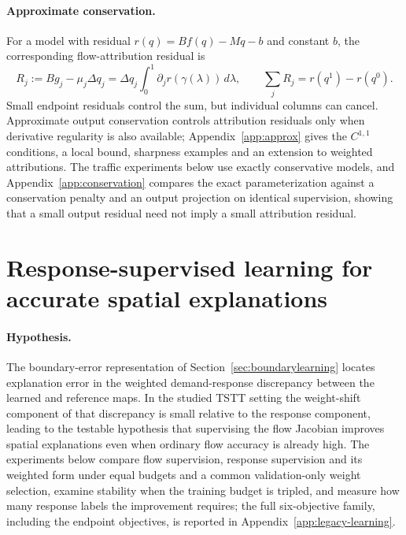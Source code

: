 \documentclass[a4paper,fleqn]{cas-sc}
\begin{document}
\paragraph{Approximate conservation.}
For a model with residual $r(q)=Bf(q)-Mq-b$ and constant $b$, the
corresponding flow-attribution residual is
\begin{equation}
R_j:=Bg_j-\mu_j\Delta q_j
=\Delta q_j\int_0^1\partial_jr(\gamma(\lambda))\,d\lambda,
\qquad \sum_jR_j=r(q^1)-r(q^0).
\label{eq:residualidentity}
\end{equation}
Small endpoint residuals control the sum, but individual columns can cancel.
Approximate output conservation controls attribution residuals only when
derivative regularity is also available; Appendix~\ref{app:approx} gives
the $C^{1,1}$ conditions, a local bound, sharpness examples and an
extension to weighted attributions. The traffic experiments below use exactly
conservative models, and Appendix~\ref{app:conservation} compares the
exact parameterization against a conservation penalty and an output
projection on identical supervision, showing that a small output
residual need not imply a small attribution residual.






\FloatBarrier
\section{Response-supervised learning for accurate spatial explanations}\label{sec:pairresults}
\paragraph{Hypothesis.}
The boundary-error representation of
Section~\ref{sec:boundarylearning} locates explanation error in the
weighted demand-response discrepancy between the learned and reference
maps. In the studied TSTT setting the weight-shift component of that
discrepancy is small relative to the response component, leading to the
testable hypothesis that supervising the flow Jacobian improves
spatial explanations even when ordinary flow accuracy is already high.
The experiments below compare flow supervision, response supervision
and its weighted form under equal budgets and a common validation-only
weight selection, examine stability when the training budget is
tripled, and measure how many response labels the improvement requires;
the full six-objective family, including the endpoint objectives, is
reported in Appendix~\ref{app:legacy-learning}.
\end{document}

